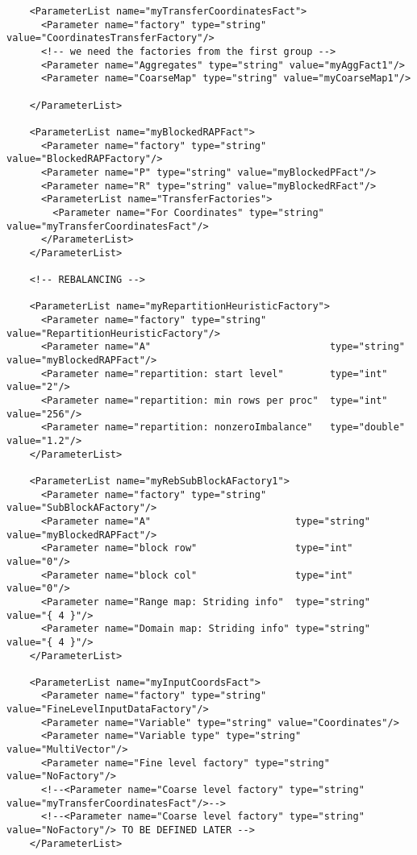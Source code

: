 \documentclass[10pt,fleqn]{book}
\begin{document}
\begin{lstlisting}
    <ParameterList name="myTransferCoordinatesFact">
      <Parameter name="factory" type="string" value="CoordinatesTransferFactory"/>
      <!-- we need the factories from the first group -->
      <Parameter name="Aggregates" type="string" value="myAggFact1"/>
      <Parameter name="CoarseMap" type="string" value="myCoarseMap1"/>

    </ParameterList>

    <ParameterList name="myBlockedRAPFact">
      <Parameter name="factory" type="string" value="BlockedRAPFactory"/>
      <Parameter name="P" type="string" value="myBlockedPFact"/>
      <Parameter name="R" type="string" value="myBlockedRFact"/>
      <ParameterList name="TransferFactories">
        <Parameter name="For Coordinates" type="string" value="myTransferCoordinatesFact"/>
      </ParameterList>
    </ParameterList>

    <!-- REBALANCING -->

    <ParameterList name="myRepartitionHeuristicFactory">
      <Parameter name="factory" type="string" value="RepartitionHeuristicFactory"/>
      <Parameter name="A"                               type="string"  value="myBlockedRAPFact"/>
      <Parameter name="repartition: start level"        type="int"     value="2"/>
      <Parameter name="repartition: min rows per proc"  type="int"     value="256"/>
      <Parameter name="repartition: nonzeroImbalance"   type="double"  value="1.2"/>
    </ParameterList>

    <ParameterList name="myRebSubBlockAFactory1">
      <Parameter name="factory" type="string" value="SubBlockAFactory"/>
      <Parameter name="A"                         type="string"  value="myBlockedRAPFact"/>
      <Parameter name="block row"                 type="int"     value="0"/>
      <Parameter name="block col"                 type="int"     value="0"/>
      <Parameter name="Range map: Striding info"  type="string"  value="{ 4 }"/>
      <Parameter name="Domain map: Striding info" type="string"  value="{ 4 }"/>
    </ParameterList>

    <ParameterList name="myInputCoordsFact">
      <Parameter name="factory" type="string" value="FineLevelInputDataFactory"/>
      <Parameter name="Variable" type="string" value="Coordinates"/>
      <Parameter name="Variable type" type="string" value="MultiVector"/>
      <Parameter name="Fine level factory" type="string" value="NoFactory"/>
      <!--<Parameter name="Coarse level factory" type="string" value="myTransferCoordinatesFact"/>-->
      <!--<Parameter name="Coarse level factory" type="string" value="NoFactory"/> TO BE DEFINED LATER -->
    </ParameterList>


\end{lstlisting}
\end{document}
